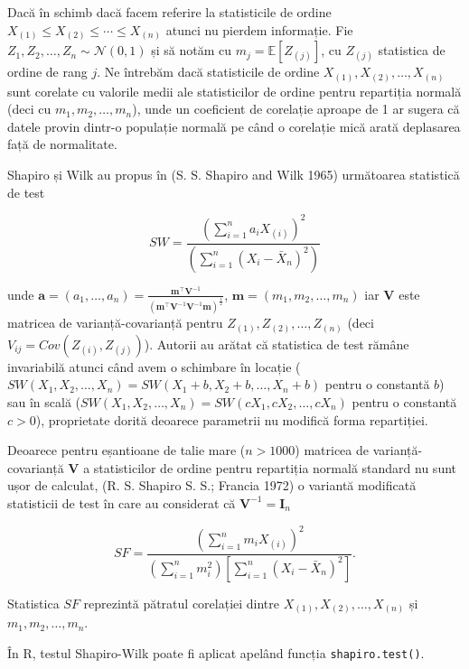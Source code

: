\documentclass[]{article}
\begin{document}
Dacă în schimb dacă facem referire la statisticile de ordine
\(X_{(1)}\leq X_{(2)}\leq \cdots\leq X_{(n)}\) atunci nu pierdem
informație. Fie \(Z_1, Z_2, \ldots, Z_n\sim \mathcal{N}(0,1)\) și să
notăm cu \(m_j = \mathbb{E}[Z_{(j)}]\), cu \(Z_{(j)}\) statistica de
ordine de rang \(j\). Ne întrebăm dacă statisticile de ordine
\(X_{(1)}, X_{(2)}, \ldots, X_{(n)}\) sunt corelate cu valorile medii
ale statisticilor de ordine pentru repartiția normală (deci cu
\(m_1, m_2, \ldots, m_n\)), unde un coeficient de corelație aproape de 1
ar sugera că datele provin dintr-o populație normală pe când o corelație
mică arată deplasarea față de normalitate.

Shapiro și Wilk au propus în (S. S. Shapiro and Wilk 1965) următoarea
statistică de test

\[
  SW = \frac{\left(\sum_{i = 1}^{n}a_iX_{(i)}\right)^2}{\left(\sum_{i = 1}^{n}(X_i - \bar{X}_n)^2\right)}
\]

unde
\(\mathbf{a} = (a_1, \ldots, a_n) = \frac{\mathbf{m}^\intercal \mathbf{V}^{-1}}{\left(\mathbf{m}^\intercal \mathbf{V}^{-1}\mathbf{V}^{-1}\mathbf{m}\right)^\frac{1}{2}}\),
\(\mathbf{m} = (m_1, m_2, \ldots, m_n)\) iar \(\mathbf{V}\) este
matricea de varianță-covarianță pentru
\(Z_{(1)}, Z_{(2)}, \ldots, Z_{(n)}\) (deci
\(V_{ij} = Cov(Z_{(i)}, Z_{(j)})\)). Autorii au arătat că statistica de
test rămâne invariabilă atunci când avem o schimbare în locație
(\(SW(X_1, X_2, \ldots, X_n) = SW(X_1+b, X_2+b, \ldots, X_n+b)\) pentru
o constantă \(b\)) sau în scală
(\(SW(X_1, X_2, \ldots, X_n) = SW(cX_1, cX_2, \ldots, cX_n)\) pentru o
constantă \(c>0\)), proprietate dorită deoarece parametrii nu modifică
forma repartiției.

Deoarece pentru eșantioane de talie mare (\(n>1000\)) matricea de
varianță-covarianță \(\mathbf{V}\) a statisticilor de ordine pentru
repartiția normală standard nu sunt ușor de calculat, (R. S. Shapiro S.
S.; Francia 1972) o variantă modificată statisticii de test în care au
considerat că \(\mathbf{V}^{-1} = \mathbf{I}_n\)

\[
  SF = \frac{\left(\sum_{i = 1}^{n}m_iX_{(i)}\right)^2}{\left(\sum_{i =1}^{n}m_i^2\right)\left[\sum_{i = 1}^{n}(X_i - \bar{X}_n)^2\right]}.
\]

Statistica \(SF\) reprezintă pătratul corelației dintre
\(X_{(1)}, X_{(2)}, \ldots, X_{(n)}\) și \(m_1, m_2, \ldots, m_n\).

În R, testul Shapiro-Wilk poate fi aplicat apelând funcția
\texttt{shapiro.test()}.
\end{document}
